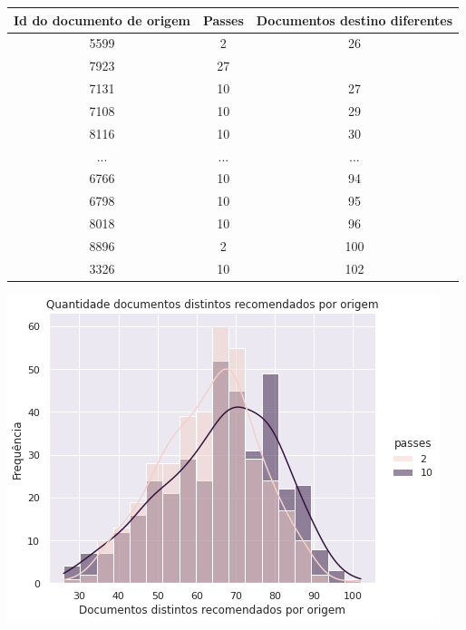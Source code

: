 \begin{center}
    \begin{tabular}{|c|c|c|}
        \hline
        Id do documento de origem & Passes & Documentos destino diferentes \\
        \hline
        5599 & 2 & 26 \\
        \hline
        7923 & 27 & \\
        \hline
        7131 & 10 & 27 \\
        \hline
        7108 & 10 & 29 \\
        \hline
        8116 & 10 & 30 \\
        \hline
        ... & ... & ... \\
        \hline
        6766 & 10 & 94 \\
        \hline
        6798 & 10 & 95 \\
        \hline
        8018 & 10 & 96 \\
        \hline
        8896 & 2 & 100 \\
        \hline
        3326 & 10 & 102 \\
        \hline
    \end{tabular}
\end{center}

\includegraphics[scale=0.7]{resultados/resources/distribuicao_semelhantes_distintos_passes.png}

